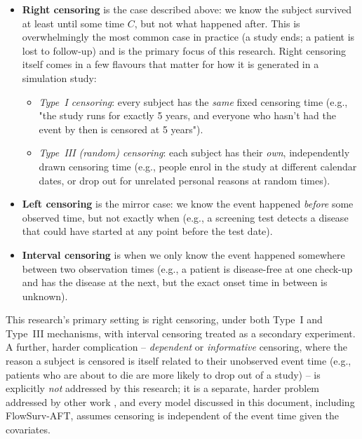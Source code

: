 \documentclass[11pt]{article}
\begin{document}
\begin{itemize}
  \item \textbf{Right censoring} is the case described above: we know the
    subject survived at least until some time $C$, but not what happened
    after. This is overwhelmingly the most common case in practice (a
    study ends; a patient is lost to follow-up) and is the primary focus
    of this research. Right censoring itself comes in a few flavours that
    matter for how it is generated in a simulation study:
    \begin{itemize}
      \item \emph{Type~I censoring}: every subject has the \emph{same}
        fixed censoring time (e.g., "the study runs for exactly 5
        years, and everyone who hasn't had the event by then is
        censored at 5 years").
      \item \emph{Type~III (random) censoring}: each subject has their
        \emph{own}, independently drawn censoring time (e.g., people
        enrol in the study at different calendar dates, or drop out for
        unrelated personal reasons at random times).
    \end{itemize}
  \item \textbf{Left censoring} is the mirror case: we know the event
    happened \emph{before} some observed time, but not exactly when
    (e.g., a screening test detects a disease that could have started
    at any point before the test date).
  \item \textbf{Interval censoring} is when we only know the event
    happened somewhere between two observation times (e.g., a patient is
    disease-free at one check-up and has the disease at the next, but the
    exact onset time in between is unknown).
\end{itemize}

This research's primary setting is right censoring, under both Type~I and
Type~III mechanisms, with interval censoring treated as a secondary
experiment. A further, harder complication -- \emph{dependent} or
\emph{informative} censoring, where the reason a subject is censored is
itself related to their unobserved event time (e.g., patients who are
about to die are more likely to drop out of a study) -- is explicitly
\emph{not} addressed by this research; it is a separate, harder problem
addressed by other work \citep{gharari2023copula}, and every model
discussed in this document, including FlowSurv-AFT, assumes censoring is
independent of the event time given the covariates.
\end{document}

